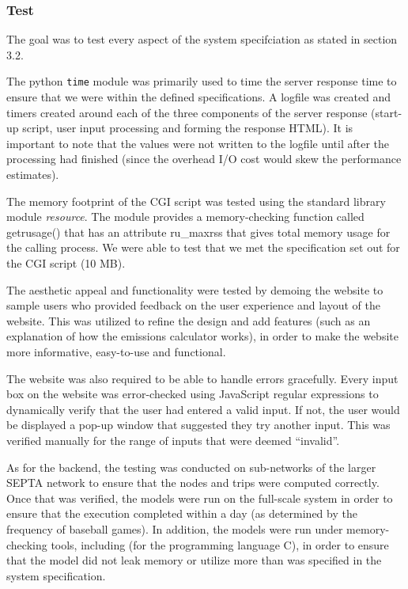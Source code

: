 
\subsubsection{Test}
The goal was to test every aspect of the system specifciation as
stated in section 3.2.

The python \texttt{time} module was primarily used to time the server
response time to ensure that we were within the defined
specifications.  A logfile was created and timers created around each
of the three components of the server response (start-up script, user
input processing and forming the response HTML). It is important to
note that the values were not written to the logfile until after the
processing had finished (since the overhead I/O cost would skew the
performance estimates).

The memory footprint of the CGI script was tested using the standard
library module \emph{resource}. The module provides a memory-checking
function called getrusage() that has an attribute ru_maxrss that gives
total memory usage for the calling process. We were able to test that
we met the specification set out for the CGI script (10 MB).

The aesthetic appeal and functionality were tested by demoing the
website to sample users who provided feedback on the user experience
and layout of the website. This was utilized to refine the design and
add features (such as an explanation of how the emissions calculator
works), in order to make the website more informative, easy-to-use and
functional.

The website was also required to be able to handle errors
gracefully. Every input box on the website was error-checked using
JavaScript regular expressions to dynamically verify that the user had
entered a valid input. If not, the user would be displayed a pop-up
window that suggested they try another input. This was verified
manually for the range of inputs that were deemed ``invalid''.

As for the backend, the testing was conducted on sub-networks of the
larger SEPTA network to ensure that the nodes and trips were computed
correctly. Once that was verified, the models were run on the
full-scale system in order to ensure that the execution completed
within a day (as determined by the frequency of baseball games). In
addition, the models were run under memory-checking tools, including
 (for the programming language C), in order to ensure that the
model did not leak memory or utilize more than was specified in the
system specification.

